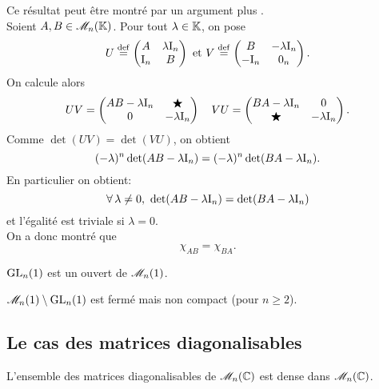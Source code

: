 Ce résultat peut être montré par un argument plus . \\
Soient $A, B \in \mathscr{M}_n(\mathbb{K})$. Pour tout $\lambda \in \mathbb{K}$, on pose
$$
U \overset{\mathrm{\tiny def}}{=}
\begin{pmatrix}
    A & \lambda \mathrm{I}_n \\
    \mathrm{I}_n & B
\end{pmatrix}
\text{ et }
V \overset{\mathrm{\tiny def}}{=} 
\begin{pmatrix}
    B & -\lambda \mathrm{I}_n \\
    -\mathrm{I}_n & 0_n
\end{pmatrix}.
$$
On calcule alors
$$UV = 
\begin{pmatrix}
    AB - \lambda \mathrm{I}_n & \bigstar \\
    0 & -\lambda \mathrm{I}_n
\end{pmatrix}
\quad
VU = 
\begin{pmatrix}
    BA - \lambda \mathrm{I}_n & 0 \\
    \bigstar & -\lambda \mathrm{I}_n
\end{pmatrix}.
$$
Comme $\det(UV) = \det(VU)$, on obtient
$$(-\lambda)^n \det(AB - \lambda \mathrm{I}_n) = (-\lambda)^n \det(BA - \lambda \mathrm{I}_n).$$
En particulier on obtient:
$$\forall \lambda \not= 0,\ \det(AB - \lambda \I_n) = \det(BA - \lambda \I_n)$$
et l'égalité est triviale si $\lambda = 0$. \\
On a donc montré que 
$$\chi_{A B} = \chi_{B A}.$$

\begin{prop}
    $\mathrm{GL}_n(1)$ est un ouvert de $\mathscr{M}_n(1)$.
\end{prop}

\begin{prop}
    $\mathscr{M}_n(1) \setminus \mathrm{GL}_n(1)$ est fermé mais non compact (pour $n \geqslant 2$).
\end{prop}

\subsection{Le cas des matrices diagonalisables}

\begin{theo}
    L'ensemble des matrices diagonalisables de $\mathscr{M}_n(\mathbb{C})$ est dense dans $\mathscr{M}_n(\mathbb{C})$.
\end{theo}

